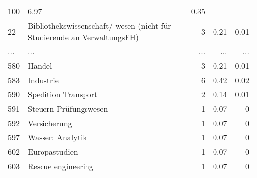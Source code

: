 \begin{longtable}{lXrrr}
          \num{100} &
          \num[round-mode=places,round-precision=2]{6.97} &
          \num[round-mode=places,round-precision=2]{0.35} \\
        22 & \multicolumn{1}{X}{Bibliothekswissenschaft/-wesen (nicht für Studierende an VerwaltungsFH)} & %
          \num{3} &
          \num[round-mode=places,round-precision=2]{0.21} &
          \num[round-mode=places,round-precision=2]{0.01} \\
       ... & ... & ... & ... & ... \\
        580 & \multicolumn{1}{X}{Handel} & %
          \num{3} &
          \num[round-mode=places,round-precision=2]{0.21} &
          \num[round-mode=places,round-precision=2]{0.01} \\

        583 & \multicolumn{1}{X}{Industrie} & %
          \num{6} &
          \num[round-mode=places,round-precision=2]{0.42} &
          \num[round-mode=places,round-precision=2]{0.02} \\

        590 & \multicolumn{1}{X}{Spedition Transport} & %
          \num{2} &
          \num[round-mode=places,round-precision=2]{0.14} &
          \num[round-mode=places,round-precision=2]{0.01} \\

        591 & \multicolumn{1}{X}{Steuern Prüfungswesen} & %
          \num{1} &
          \num[round-mode=places,round-precision=2]{0.07} &
          \num[round-mode=places,round-precision=2]{0} \\

        592 & \multicolumn{1}{X}{Versicherung} & %
          \num{1} &
          \num[round-mode=places,round-precision=2]{0.07} &
          \num[round-mode=places,round-precision=2]{0} \\

        597 & \multicolumn{1}{X}{Wasser: Analytik} & %
          \num{1} &
          \num[round-mode=places,round-precision=2]{0.07} &
          \num[round-mode=places,round-precision=2]{0} \\

        602 & \multicolumn{1}{X}{Europastudien} & %
          \num{1} &
          \num[round-mode=places,round-precision=2]{0.07} &
          \num[round-mode=places,round-precision=2]{0} \\

        603 & \multicolumn{1}{X}{Rescue engineering} & %
          \num{1} &
          \num[round-mode=places,round-precision=2]{0.07} &
          \num[round-mode=places,round-precision=2]{0} \\


\end{longtable}
